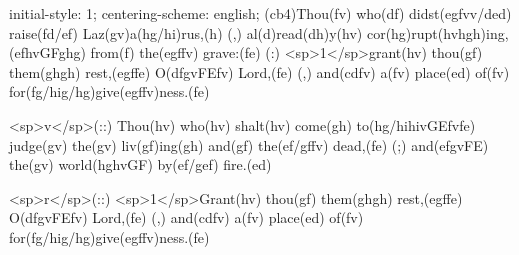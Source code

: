 initial-style: 1;
centering-scheme: english;
(cb4)Thou(fv) who(df) didst(egfvv/ded) raise(fd/ef) Laz(gv)a(hg/hi)rus,(h) (,) al(d)read(dh)y(hv) cor(hg)rupt(hvhgh)ing,(efhvGFghg) from(f) the(egffv) grave:(fe) (:) <sp>1</sp>grant(hv) thou(gf) them(ghgh) rest,(egffe) O(dfgvFEfv) Lord,(fe) (,) and(cdfv) a(fv) place(ed) of(fv) for(fg/hig/hg)give(egffv)ness.(fe)

<sp>v</sp>(::) Thou(hv) who(hv) shalt(hv) come(gh) to(hg/hihivGEfvfe) judge(gv) the(gv) liv(gf)ing(gh) and(gf) the(ef/gffv) dead,(fe) (;) and(efgvFE) the(gv) world(hghvGF) by(ef/gef) fire.(ed)

<sp>r</sp>(::) <sp>1</sp>Grant(hv) thou(gf) them(ghgh) rest,(egffe) O(dfgvFEfv) Lord,(fe) (,) and(cdfv) a(fv) place(ed) of(fv) for(fg/hig/hg)give(egffv)ness.(fe)